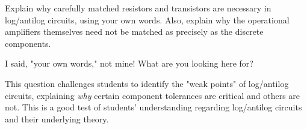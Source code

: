 

Explain why carefully matched resistors and transistors are necessary in log/antilog circuits, using your own words.  Also, explain why the operational amplifiers themselves need not be matched as precisely as the discrete components.







I said, "your own words," not mine!  What are you looking here for?







This question challenges students to identify the "weak points" of log/antilog circuits, explaining {\it why} certain component tolerances are critical and others are not.  This is a good test of students' understanding regarding log/antilog circuits and their underlying theory.




